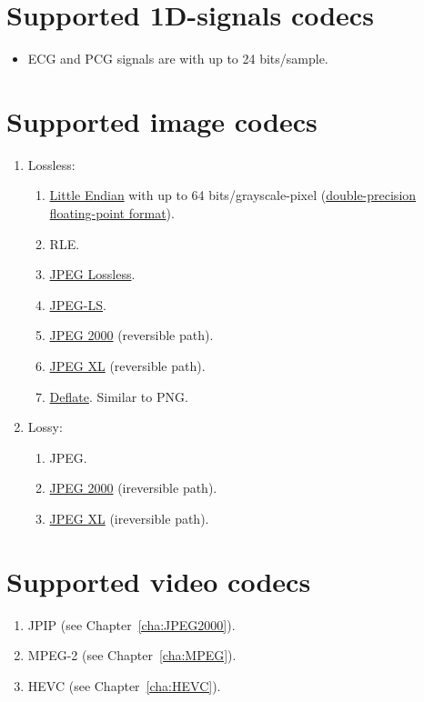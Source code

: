 \section{Supported 1D-signals codecs}
\begin{itemize}
\item \gls{ECG} and \gls{PCG} signals are  with up to 24
  bits/sample.
\end{itemize}

\section{Supported image codecs}
\begin{enumerate}
\item Lossless:
  \begin{enumerate}
  \item {}
    \href{https://en.wikipedia.org/wiki/Endianness}{Little Endian}
    with up to 64 bits/grayscale-pixel
    (\href{https://en.wikipedia.org/wiki/Double-precision_floating-point_format}{double-precision
      floating-point format}).
  \item \gls{RLE}.
  \item \href{https://en.wikipedia.org/wiki/Lossless_JPEG}{JPEG Lossless}.
  \item \href{https://en.wikipedia.org/wiki/Lossless_JPEG\#JPEG_LS}{JPEG-LS}.
  \item \href{https://en.wikipedia.org/wiki/JPEG_2000}{JPEG 2000}
    (reversible path).
  \item \href{https://en.wikipedia.org/wiki/JPEG_XL}{JPEG XL}
    (reversible path).
  \item \href{https://en.wikipedia.org/wiki/Deflate}{Deflate}. Similar
    to \gls{PNG}.
  \end{enumerate}
\item Lossy:
  \begin{enumerate}
  \item \gls{JPEG}.
  \item \href{https://en.wikipedia.org/wiki/JPEG_2000}{JPEG 2000}
    (ireversible path).
  \item \href{https://en.wikipedia.org/wiki/JPEG_XL}{JPEG XL}
    (ireversible path).
  \end{enumerate}
\end{enumerate}

\section{Supported video codecs}
\begin{enumerate}
\item \gls{JPIP} (see Chapter~\ref{cha:JPEG2000}).
\item \gls{MPEG}-2 (see Chapter~\ref{cha:MPEG}).
\item \gls{HEVC} (see Chapter~\ref{cha:HEVC}).
\end{enumerate}

